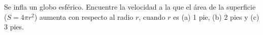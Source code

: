 \item Se infla un globo esférico. Encuentre la velocidad a la que el área de la superficie ($S = 4\pi r^2$) aumenta con respecto al radio $r$, cuando $r$ es (a) 1 pie, (b) 2 pies y (c) 3 pies.
